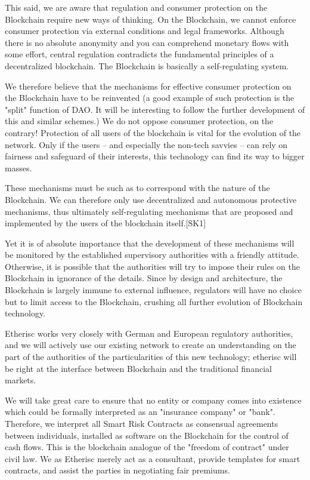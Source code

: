 \documentclass[12pt]{article}
\begin{document}
This said, we are aware that regulation and consumer protection on the Blockchain require new ways of thinking. On the Blockchain, we cannot enforce consumer protection via external conditions and legal frameworks. Although there is no absolute anonymity and you can comprehend monetary flows with some effort, central regulation contradicts the fundamental principles of a decentralized blockchain. The Blockchain is basically a self-regulating system.

We therefore believe that the mechanisms for effective consumer protection on the Blockchain have to be reinvented (a good example of such protection is the "split" function of DAO. It will be interesting to follow the further development of this and similar schemes.)
We do not oppose consumer protection, on the contrary! Protection of all users of the blockchain  is vital for the evolution of the network. Only if the users – and  especially the non-tech savvies – can rely on fairness and safeguard of their interests, this technology can find its way to bigger masses.

These mechanisms must be such as to  correspond with the nature of the Blockchain. We can therefore only use decentralized and autonomous protective mechanisms, thus ultimately self-regulating mechanisms that are proposed and implemented by the users of the blockchain itself.[SK1] 

Yet it is of absolute importance that the development of these mechanisms will be monitored by  the established supervisory authorities with a friendly attitude. Otherwise, it is possible that the authorities will try to impose their rules on the Blockchain in ignorance of the details. Since by design and architecture, the Blockchain is largely immune to external influence, regulators will have no choice but to limit access to the Blockchain, crushing all further evolution of  Blockchain technology.

Etherisc works very closely with German and European regulatory authorities, and we will actively use our existing network to create an understanding on the part of the authorities of the particularities of this new technology; etherisc will be right at the interface between Blockchain and the traditional financial markets.

We will take great care to ensure that no entity or company comes into existence which could be formally interpreted as an "insurance company" or "bank". Therefore, we interpret all Smart Risk Contracts as consensual agreements between individuals, installed as software on the Blockchain for the control of cash flows. This is the blockchain analogue of the "freedom of contract" under civil law. We as Etherisc merely act as a consultant, provide templates for smart contracts, and assist the parties in negotiating fair premiums.
\end{document}
